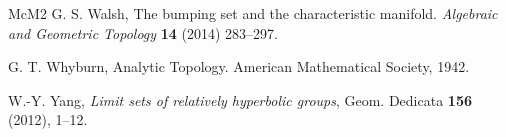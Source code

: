 \documentclass[11pt]{article}
\theoremstyle{definition}
\begin{document}
\begin{thebibliography}{McM2}
 G. S. Walsh, The bumping set and the characteristic manifold. {
\em Algebraic and Geometric Topology} {\bf 14} (2014)  283--297.  

 G. T. Whyburn, {Analytic Topology}. American Mathematical Society, 1942. 


 W.-Y. Yang, {\it Limit sets of relatively hyperbolic groups}, Geom. Dedicata {\bf 156} (2012), 1--12. 

\end{thebibliography}
\end{document}
